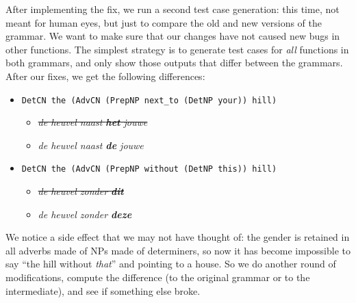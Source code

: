 \documentclass[11pt]{article}
\def\t#1{\texttt{#1}}
\begin{document}
After implementing the fix, we run a second test case generation: this
time, not meant for human eyes, but just to compare the old and new
versions of the grammar. We want to make sure that our changes 
have not caused new bugs in other functions. The simplest strategy is
to generate test cases for \emph{all} functions in both grammars, and
only show those outputs that differ between the grammars. After our
fixes, we get the following differences: 

\begin{itemize}
\item \t{DetCN the (AdvCN (PrepNP next\_to (DetNP your)) hill)}
  \begin{itemize}
   \item \emph{\sout{de heuvel naast {\bf  het} jouwe}}
   \item \emph{de heuvel naast {\bf  de} jouwe}
  \end{itemize}
\item \t{DetCN the (AdvCN (PrepNP without (DetNP this)) hill)}
  \begin{itemize}
   \item \emph{\sout{de heuvel zonder {\bf  dit}}}
   \item \emph{de heuvel zonder {\bf  deze}}
  \end{itemize}
\end{itemize}

\noindent We notice a side effect that we may not have thought of: the
gender is retained in all adverbs made of NPs made of determiners, so
now it has become impossible to say ``the hill without \emph{that}'' and
pointing to a house. So we do another round of modifications, compute
the difference (to the original grammar or to the intermediate), and
see if something else broke.


\end{document}
